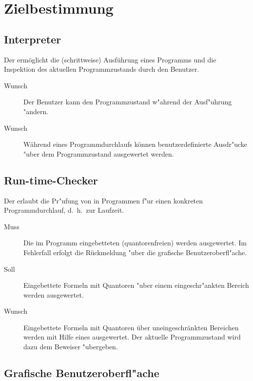 \section{Zielbestimmung}%


\subsection{Interpreter}%

Der  ermöglicht die (schrittweise) Ausführung eines Programms und die Inspektion des aktuellen Programmzustands durch den Benutzer.%

\begin{description}%
    \item[Wunsch] Der Benutzer kann den Programmzustand w"ahrend der Ausf"uhrung "andern.%
    \item[Wunsch] Während eines Programmdurchlaufs können benutzerdefinierte Ausdr"ucke "uber dem Programmzustand ausgewertet werden.%
\end{description}%

\subsection{Run-time-Checker}%

Der  erlaubt die Pr"ufung von  in Programmen f"ur einen konkreten Programmdurchlauf, d.~h.\ zur Laufzeit.%

\begin{description}%
    \item [Muss] Die im Programm eingebetteten (quantorenfreien)  werden ausgewertet. Im Fehlerfall erfolgt die Rückmeldung "uber die grafische Benutzeroberfl"ache.
    \item [Soll] Eingebettete Formeln mit Quantoren "uber einem eingeschr"ankten Bereich werden ausgewertet.%
    \item [Wunsch] Eingebettete Formeln mit Quantoren über uneingeschränkten Bereichen werden mit Hilfe eines  ausgewertet. Der aktuelle Programmzustand wird dazu dem Beweiser "ubergeben.
\end{description}%

\subsection{Grafische Benutzeroberfl"ache}%

